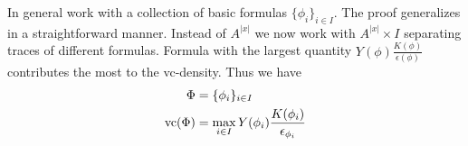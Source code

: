 \documentclass{amsart}
\begin{document}
In general work with a collection of basic formulas $\{\phi_i\}_{i \in I}$.
The proof generalizes in a straightforward manner.
Instead of $A^{|x|}$ we now work with $A^{|x|} \times I$ separating traces of different formulas.
Formula with the largest quantity $Y(\phi)\frac{K(\phi)}{\epsilon(\phi)}$ contributes the most to the vc-density.
Thus we have
\begin{align*}
	\Phi &= \{\phi_i\}_{i \in I} \\
	\operatorname{vc}(\Phi) &=  \max_{i \in I} Y(\phi_i) \frac{K(\phi_i)}{\epsilon_{\phi_i}}
\end{align*}










%
%
%
%
\end{document}
